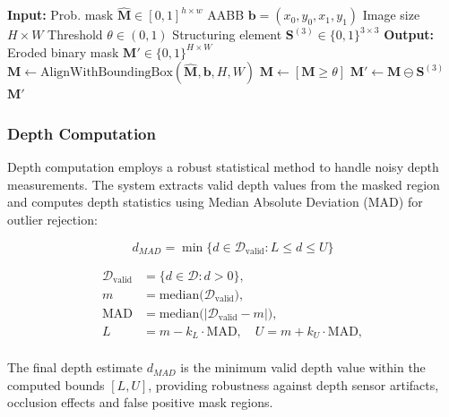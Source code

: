 \begin{algorithm}[H]
\caption{Process Mask: Thresholding, Resizing, and Erosion}
\label{alg:mask_processing}
\begin{algorithmic}[1]
\STATE \textbf{Input:}
\STATE \quad Prob. mask \(\hat{\mathbf{M}} \in [0,1]^{h \times w}\)
\STATE \quad AABB \(\mathbf{b} = (x_0, y_0, x_1, y_1)\)
\STATE \quad Image size \(H \times W\)
\STATE \quad Threshold \(\theta \in (0,1)\)
\STATE \quad Structuring element \(\mathbf{S}^{(3)} \in \{0,1\}^{3 \times 3}\)
\STATE \textbf{Output:}
\STATE \quad Eroded binary mask \(\mathbf{M}' \in \{0,1\}^{H \times W}\)
\STATE \(\mathbf{M} \leftarrow \text{AlignWithBoundingBox}(\hat{\mathbf{M}}, \mathbf{b}, H, W)\) 
\STATE \(\mathbf{M} \leftarrow [\mathbf{M} \geq \theta]\) 
\STATE \(\mathbf{M}' \leftarrow \mathbf{M} \ominus \mathbf{S}^{(3)}\) 
\RETURN \(\mathbf{M}'\)
\end{algorithmic}
\end{algorithm}


\subsubsection{Depth Computation}
Depth computation employs a robust statistical method to handle noisy depth measurements. The system extracts valid depth values from the masked region and computes depth statistics using Median Absolute Deviation (MAD) for outlier rejection:

\begin{equation}
    d_{MAD} = \min\bigl\{d \in \mathcal{D}_{\text{valid}} : L \le d \le U \bigr\}
\end{equation}

\begin{equation}
\begin{aligned}
\mathcal{D}_{\text{valid}} &= \{d \in \mathcal{D} : d > 0\},\\
m &= \mathrm{median}\bigl(\mathcal{D}_{\text{valid}}\bigr),\\
\mathrm{MAD} &= \mathrm{median}\bigl(|\mathcal{D}_{\text{valid}} - m|\bigr),\\
L &= m - k_{L} \cdot \mathrm{MAD},\quad U = m + k_{U} \cdot \mathrm{MAD},\\
\end{aligned}
\end{equation}

The final depth estimate \(d_{MAD}\) is the minimum valid depth value within the computed bounds \([L, U]\), providing robustness against depth sensor artifacts, occlusion effects and false positive mask regions.

